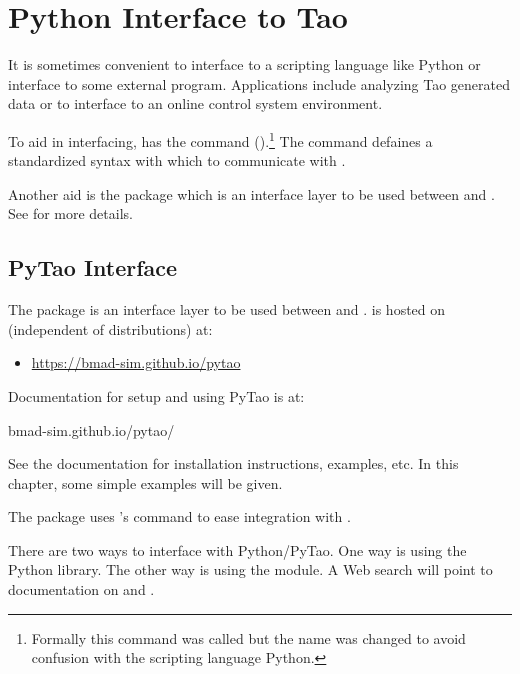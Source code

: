 \chapter{Python Interface to Tao}
\label{c:python}

It is sometimes convenient to interface \tao to a scripting language like Python or interface to
some external program.  Applications include analyzing Tao generated data or 
to interface \tao to an online control system environment.

To aid in interfacing, \tao has the  command ().\footnote
  {
Formally this command was called  but the name was changed to avoid confusion with
the scripting language Python.
  }
The  command defaines a standardized syntax with which to communicate with \tao.

Another aid is the  package which is an interface layer to be used between \tao and
. See  for more details.

\section{PyTao Interface}
\label{s:pytao}

The  package is an interface layer to be used between \tao and
.  is hosted on 
(independent of \bmad distributions) at:
\vspace{-2ex}
\begin{itemize}
  \item[] \url{https://bmad-sim.github.io/pytao}
\end{itemize}
\vspace{-2ex}
Documentation for setup and using PyTao is at:
\begin{example}
  bmad-sim.github.io/pytao/
\end{example}
See the  documentation for installation instructions, examples, etc. In this chapter, some
simple examples will be given.

The  package uses \tao's  command to ease integration with .

There are two ways to interface with Python/PyTao. One way is using the Python 
library. The other way is using the  module. A Web search will point to documentation on
 and . 

